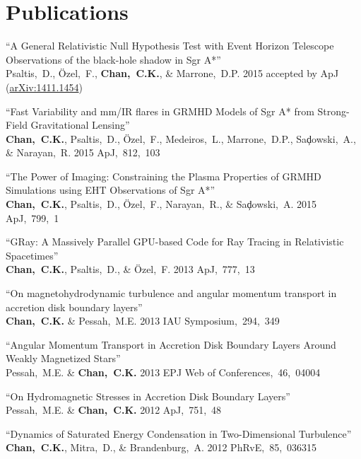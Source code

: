 \section*{Publications}

\begin{ilist}

\item ``A General Relativistic Null Hypothesis Test with Event Horizon Telescope Observations of the black-hole shadow in Sgr A*''\\
  Psaltis,~D., {\"O}zel,~F., \textbf{Chan,~C.K.}, \& Marrone,~D.P.
  2015 accepted by ApJ (\href{http://arxiv.org/abs/1411.1454}{arXiv:1411.1454})

\item ``Fast Variability and mm/IR flares in GRMHD Models of Sgr A* from Strong-Field Gravitational Lensing''\\
  \textbf{Chan,~C.K.}, Psaltis,~D., {\"O}zel,~F., Medeiros,~L., Marrone,~D.P., Sa{\c d}owski,~A., \& Narayan,~R.
  2015 ApJ,~812,~103

\item ``The Power of Imaging: Constraining the Plasma Properties of GRMHD Simulations using EHT Observations of Sgr A*''\\
  \textbf{Chan,~C.K.}, Psaltis,~D., {\"O}zel,~F., Narayan,~R., \& Sa{\c d}owski,~A.
  2015 ApJ,~799,~1

\item ``GRay: A Massively Parallel GPU-based Code for Ray Tracing in Relativistic Spacetimes''\\
  \textbf{Chan,~C.K.}, Psaltis,~D., \& {\"O}zel,~F.
  2013 ApJ,~777,~13

\item ``On magnetohydrodynamic turbulence and angular momentum transport in accretion disk boundary layers''\\
  \textbf{Chan,~C.K.} \& Pessah,~M.E.
  2013 IAU Symposium,~294,~349

\item ``Angular Momentum Transport in Accretion Disk Boundary Layers Around Weakly Magnetized Stars''\\
  Pessah,~M.E. \& \textbf{Chan,~C.K.}
  2013  EPJ Web of Conferences,~46,~04004

\item ``On Hydromagnetic Stresses in Accretion Disk Boundary Layers''\\
  Pessah,~M.E. \& \textbf{Chan,~C.K.}
  2012 ApJ,~751,~48

\item ``Dynamics of Saturated Energy Condensation in Two-Dimensional Turbulence''\\
  \textbf{Chan,~C.K.}, Mitra,~D., \& Brandenburg,~A.
  2012 PhRvE,~85,~036315


\end{ilist}
